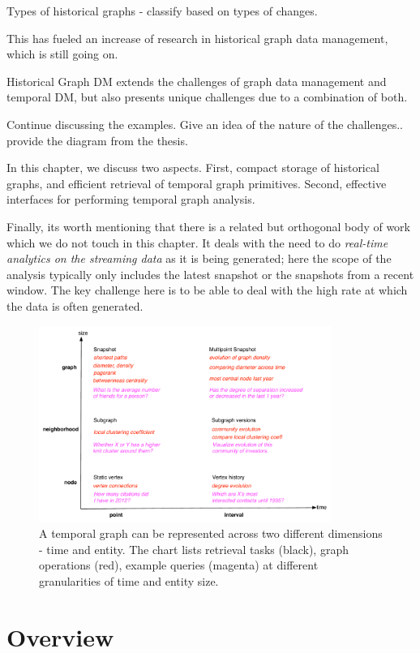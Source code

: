 \documentclass{svjour3}
\begin{document}
Types of historical graphs - classify based on types of changes.

This has fueled an increase of research in historical graph data management, which is still going on. 

Historical Graph DM extends the challenges of graph data management and temporal DM, but also presents unique challenges due to a combination of both.

Continue discussing the examples. Give an idea of the nature of the challenges.. provide the diagram from the thesis.

In this chapter, we discuss two aspects. First, compact storage of historical graphs, and efficient retrieval of temporal graph primitives. Second, effective interfaces for performing temporal graph analysis.

Finally, its worth mentioning that there is a related but orthogonal body of work which we do not touch in this chapter. It deals with the need to do {\em real-time analytics on the streaming data} as it is being generated; here the scope of the analysis typically only includes the latest snapshot or the snapshots from a recent window. The key challenge here is to be able to deal with the high rate at which the data is often generated.

\begin{figure}
\centering
\includegraphics [width=0.85\textwidth]{entity-time.pdf}
\caption{A temporal graph can be represented across two different dimensions - time
and entity. The chart lists retrieval tasks (black), graph operations (red), example queries
(magenta) at different granularities of time and entity size.}
\label{fig:et}
\end{figure}

\section{Overview}
\end{document}
